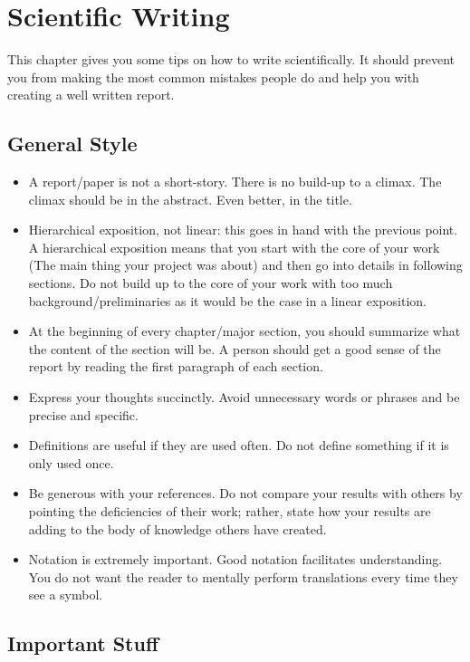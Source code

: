 \chapter{Scientific Writing}\label{chap:scietific_wiritng}

This chapter gives you some tips on how to write scientifically. It should prevent you from making the most common mistakes people do and help you with creating a well written report.

\section{General Style}

\begin{itemize}
	\item A report/paper is not a short-story. There is no build-up to a climax. The climax should be in the abstract. Even better, in the title.
	\item Hierarchical exposition, not linear: this goes in hand with the previous point.
	A hierarchical exposition means that you start with the core of your work (The main thing your project was about) and then go into details in following sections.
	Do not build up to the core of your work with too much background/preliminaries as it would be the case in a linear exposition.
	\item At the beginning of every chapter/major section, you should summarize what the content of the section will be.
	A person should get a good sense of the report by reading the first paragraph of each section.
	\item Express your thoughts succinctly.
	Avoid unnecessary words or phrases and be precise and specific.
	\item Definitions are useful if they are used often.
	Do not define something if it is only used once.
	\item Be generous with your references.
	Do not compare your results with others by pointing the deficiencies of their work; rather, state how your results are adding to the body of knowledge others have created.
	\item Notation is extremely important.
	Good notation facilitates understanding. You do not want the reader to mentally perform translations every time they see a symbol.
\end{itemize}

\section{Important Stuff}

